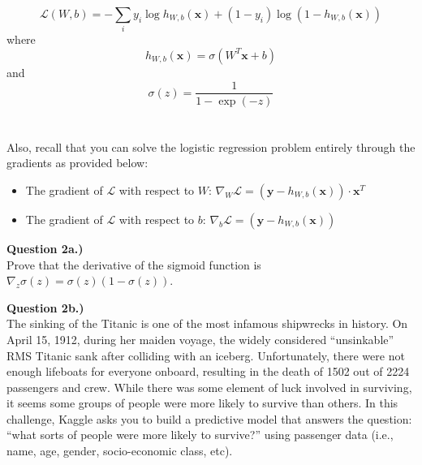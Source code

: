 \documentclass[paper=a4, fontsize=11pt]{scrartcl} %
\begin{document}
\begin{equation}
    \mathcal{L}(W, b) = -\sum_i y_i \log{ h_{W,b}(\textbf{x}) } + (1 - y_i) \log{( 1 - h_{W,b}(\textbf{x})) } \nonumber
\end{equation}
where 
\begin{equation}
h_{W,b}(\textbf{x}) = \sigma \left( W^T\textbf{x} + b \right) \nonumber
\end{equation}
and
\begin{equation}
\sigma(z) = \frac{1}{1 - \exp(-z)} \nonumber
\end{equation} \\
\\
Also, recall that you can solve the logistic regression problem entirely through the gradients as provided below:

\begin{itemize}
    \item The gradient of $\mathcal{L}$ with respect to $W$: $\nabla_W \mathcal{L} = \left(\textbf{y} - h_{W,b}(\textbf{x}) \right) \cdot \textbf{x}^T$
    \item The gradient of $\mathcal{L}$ with respect to $b$: $\nabla_b \mathcal{L} = \left(\textbf{y} - h_{W,b}(\textbf{x}) \right)$
\end{itemize}

\vspace{1cm}
{\Large \textbf{Question 2a.)}} \\

Prove that the derivative of the sigmoid function is $\nabla_z \sigma(z) = \sigma(z) \left(1 - \sigma(z)\right)$. 


\vspace{1cm}
{\Large \textbf{Question 2b.)}} \\

The sinking of the Titanic is one of the most infamous shipwrecks in history. On April 15, 1912, during her maiden voyage, the widely considered “unsinkable” RMS Titanic sank after colliding with an iceberg. Unfortunately, there were not enough lifeboats for everyone onboard, resulting in the death of 1502 out of 2224 passengers and crew. While there was some element of luck involved in surviving, it seems some groups of people were more likely to survive than others. In this challenge, Kaggle asks you to build a predictive model that answers the question: “what sorts of people were more likely to survive?” using passenger data (i.e., name, age, gender, socio-economic class, etc). \\
\end{document}
